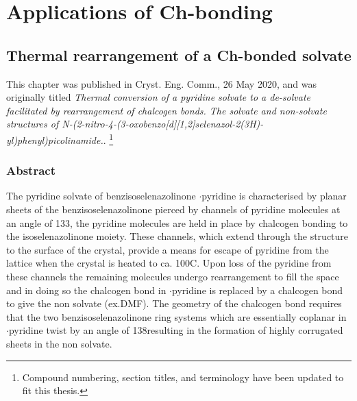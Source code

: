 \part{Applications of Ch-bonding}

\begin{refsection}

\chapter{Thermal rearrangement of a Ch-bonded solvate}
\label{sec:thermal-conversion}

This chapter was published in Cryst. Eng. Comm., 26 May 2020, and was originally titled \emph{Thermal conversion of a pyridine solvate to a de-solvate facilitated by rearrangement of chalcogen bonds. The solvate and non-solvate structures of N-(2-nitro-4-(3-oxobenzo[\emph{d}][1,2]selenazol-2(3\emph{H})-yl)phenyl)picolinamide.}\autocite{Fellowes2020a}. \footnote{Compound numbering, section titles, and terminology have been updated to fit this thesis.}

\section{Abstract}
The pyridine solvate of benzisoselenazolinone $\cdot$pyridine is characterised by planar sheets of the benzisoselenazolinone  pierced by channels of pyridine molecules at an angle of 133\degree, the pyridine molecules are held in place by  chalcogen bonding to the isoselenazolinone moiety.
These channels, which extend through the structure to the surface of the crystal, provide a means for escape of pyridine from the lattice when the crystal is heated to ca. 100\degree C.
Upon loss of the pyridine from these channels the remaining molecules undergo rearrangement to fill the space and in doing so the  chalcogen bond in $\cdot$pyridine is replaced by a  chalcogen bond to give the non solvate (ex.DMF).
The geometry of the chalcogen bond requires that the two benzisoselenazolinone ring systems which are essentially coplanar in $\cdot$pyridine twist by an angle of 138\degree resulting in the formation of highly corrugated sheets in the non solvate.


\end{refsection}
